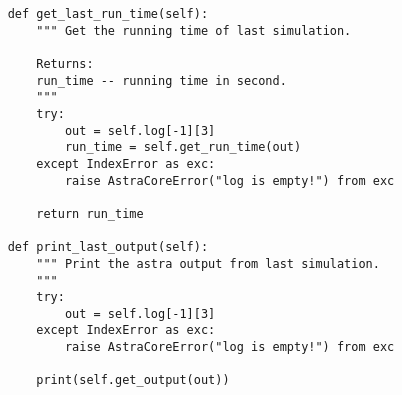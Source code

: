 \begin{footnotesize}
\begin{verbatim}
    def get_last_run_time(self):
        """ Get the running time of last simulation.

        Returns:
        run_time -- running time in second.
        """
        try:
            out = self.log[-1][3]
            run_time = self.get_run_time(out)
        except IndexError as exc:
            raise AstraCoreError("log is empty!") from exc

        return run_time

    def print_last_output(self):
        """ Print the astra output from last simulation.
        """
        try:
            out = self.log[-1][3]
        except IndexError as exc:
            raise AstraCoreError("log is empty!") from exc

        print(self.get_output(out))
\end{verbatim}
\end{footnotesize}
